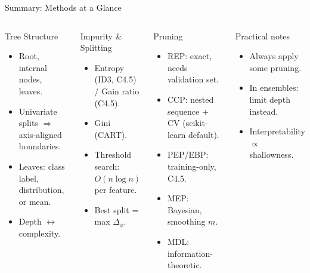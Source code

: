 \begin{frame}{Summary: Methods at a Glance}
  \begin{columns}[t]
      \begin{block}{Tree Structure}
        \begin{itemize}
          \item Root, internal nodes, leaves.
          \item Univariate splits $\Rightarrow$ axis-aligned boundaries.
          \item Leaves: class label, distribution, or mean.
          \item Depth $\leftrightarrow$ complexity.
        \end{itemize}
      \end{block}
      \vspace{0.4em}
      \begin{block}{Impurity \& Splitting}
        \begin{itemize}
          \item Entropy (ID3, C4.5) / Gain ratio (C4.5).
          \item Gini (CART).
          \item Threshold search: $O(n\log n)$ per feature.
          \item Best split = max $\Delta_\phi$.
        \end{itemize}
      \end{block}
      \begin{block}{Pruning}
        \begin{itemize}
          \item REP: exact, needs validation set.
          \item CCP: nested sequence + CV (scikit-learn default).
          \item PEP/EBP: training-only, C4.5.
          \item MEP: Bayesian, smoothing $m$.
          \item MDL: information-theoretic.
        \end{itemize}
      \end{block}
      \vspace{0.4em}
      \begin{block}{Practical notes}
        \begin{itemize}
          \item Always apply some pruning.
          \item In ensembles: limit depth instead.
          \item Interpretability $\propto$ shallowness.
        \end{itemize}
      \end{block}
  \end{columns}
\end{frame}

%
